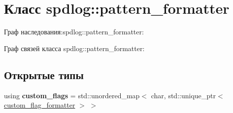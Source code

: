 \hypertarget{classspdlog_1_1pattern__formatter}{}\section{Класс spdlog\+:\+:pattern\+\_\+formatter}
\label{classspdlog_1_1pattern__formatter}


Граф наследования\+:spdlog\+:\+:pattern\+\_\+formatter\+:


Граф связей класса spdlog\+:\+:pattern\+\_\+formatter\+:
\subsection*{Открытые типы}
\begin{DoxyCompactItemize}
\item 
\mbox{\label{classspdlog_1_1pattern__formatter_ad6f7b25d7726347988c46fcf65b19bf9}} 
using {\bfseries custom\+\_\+flags} = std\+::unordered\+\_\+map$<$ char, std\+::unique\+\_\+ptr$<$ \hyperlink{classspdlog_1_1custom__flag__formatter}{custom\+\_\+flag\+\_\+formatter} $>$ $>$
\end{DoxyCompactItemize}
